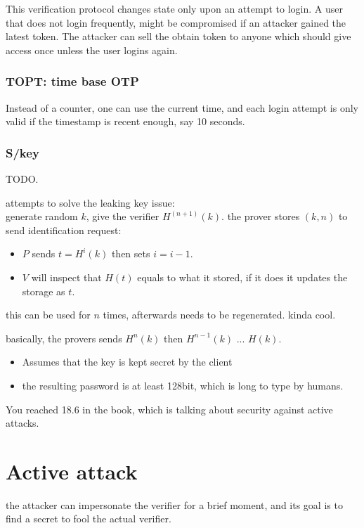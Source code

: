 \begin{rem}
This verification protocol changes state only upon an attempt to login.
A user that does not login frequently, might be compromised if an
attacker gained the latest token. The attacker can sell the obtain
token to anyone which should give access once unless the user logins
again. 
\end{rem}


\subsubsection{TOPT: time base OTP }

Instead of a counter, one can use the current time, and each login
attempt is only valid if the timestamp is recent enough, say 10 seconds.

\subsubsection{S/key }

TODO.

attempts to solve the leaking key issue: \\
generate random $k$, give the verifier $H^{(n+1)}(k)$. the prover
stores $(k,n)$ to send identification request: 
\begin{itemize}
\item $P$ sends $t=H^{i}(k)$ then sets $i=i-1$. 
\item $V$ will inspect that $H(t)$ equals to what it stored, if it does
it updates the storage as $t$.
\end{itemize}
this can be used for $n$ times, afterwards needs to be regenerated.
kinda cool. 

basically, the provers sends $H^{n}(k)$ then $H^{n-1}\left(k\right)$
... $H(k)$.
\begin{itemize}
\item Assumes that the key is kept secret by the client
\item the resulting password is at least 128bit, which is long to type by
humans. 
\end{itemize}
%
You reached 18.6 in the book, which is talking about security against
active attacks. 

\section{Active attack}

the attacker can impersonate the verifier for a brief moment, and
its goal is to find a secret to fool the actual verifier. 


